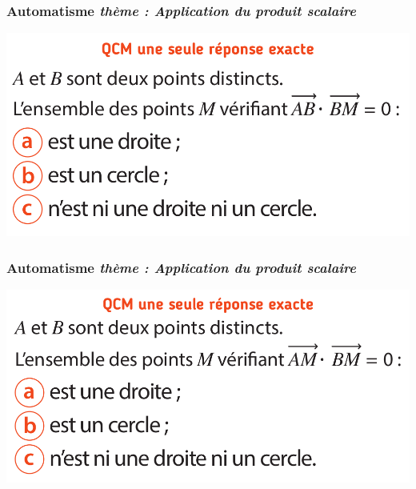 \documentclass[11pt]{beamer}
\newcounter{autocompteur}
\newcommand{\automatisme}[1]{\addtocounter{autocompteur}{1}\frametitle{Automatisme  \theautocompteur  \textit{ thème : #1}}}
\begin{document}
\begin{frame}
\automatisme{Application du produit scalaire}

\begin{center}
\includegraphics[scale=0.3]{ressources/prodscal-7.png}
\end{center}


\end{frame}



\begin{frame}
\automatisme{Application du produit scalaire}

\begin{center}
\includegraphics[scale=0.3]{ressources/prodscal-8.png}
\end{center}


\end{frame}
\end{document}
